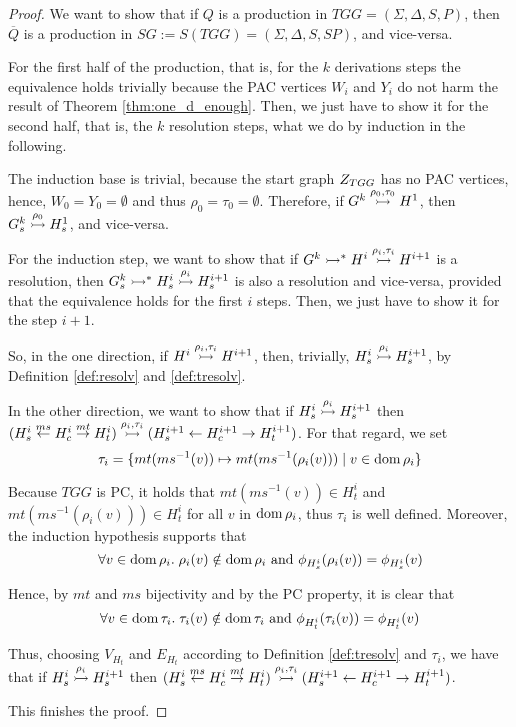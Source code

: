 \begin{proof}
	We want to show that if $Q$ is a production in $TGG = (\Sigma, \Delta, S, P)$, then $\overline{Q}$ is a production in $SG := S(TGG) = (\Sigma, \Delta, S, SP)$, and vice-versa.
	
	For the first half of the production, that is, for the $k$ derivations steps the equivalence holds trivially because the PAC vertices $W_i$ and $Y_i$ do not harm the result of Theorem \ref{thm:one_d_enough}. Then, we just have to show it for the second half, that is, the $k$ resolution steps, what we do by induction in the following.
	
	The induction base is trivial, because the start graph $Z_{TGG}$ has no PAC vertices, hence, $W_0 = Y_0 = \emptyset$ and thus $\rho_0 = \tau_0 = \emptyset$. Therefore, if $G^k \overset{\rho_0,\tau_0}{\rightarrowtail} H^1$, then $G^k_s \overset{\rho_0}{\rightarrowtail} H_s^1$, and vice-versa.
	
	For the induction step, we want to show that if $G^k \rightarrowtail^*_{} H^i \overset{\rho_{i},\tau_{i}}{\rightarrowtail} H^{i+1}$ is a resolution, then $G^k_s \rightarrowtail^*_{} H^i_s \overset{\rho_{i}}{\rightarrowtail} H^{i+1}_s$ is also a resolution and vice-versa, provided that the equivalence holds for the first $i$ steps. Then, we just have to show it for the step $i+1$.
	
	So, in the one direction, if $H^i \overset{\rho_{i},\tau_{i}}{\rightarrowtail} H^{i+1}$, then, trivially, $H^i_s \overset{\rho_{i}}{\rightarrowtail} H^{i+1}_s$, by Definition \ref{def:resolv} and \ref{def:tresolv}.
	
	In the other direction, we want to show that if $H^i_s \overset{\rho_{i}}{\rightarrowtail} H^{i+1}_s$ then $(H^i_s \overset{ms}{\leftarrow} H^i_c \overset{mt}{\rightarrow} H^i_t) \overset{\rho_i,\tau_i}{\rightarrowtail} (H^{i+1}_s \overset{}{\leftarrow} H^{i+1}_c \overset{}{\rightarrow} H^{i+1}_t)$. For that regard, we set 
	\begin{equation*}
		\tau_i = \{mt(ms^{-1}(v)) \mapsto mt(ms^{-1}(\rho_i(v))) \; | \; v \in \operatorname{dom} \rho_i \}
	\end{equation*}
	
	Because $TGG$ is PC, it holds that $mt(ms^{-1}(v)) \in H^i_t$ and $mt(ms^{-1}(\rho_i(v))) \in H^i_t$ for all $v$ in $\operatorname{dom} \rho_i$, thus $\tau_i$ is well defined. Moreover, the induction hypothesis supports that
	\begin{equation*}
		\forall v \in \operatorname{dom} \rho_i . \; \rho_i(v) \notin \operatorname{dom} \rho_i \text{ and } \phi_{H^i_s}(\rho_i(v)) = \phi_{H^i_s}(v)
	\end{equation*}
	
	Hence, by $mt$ and $ms$ bijectivity and by the PC property, it is clear that
	\begin{equation*}
		\forall v \in \operatorname{dom} \tau_i . \; \tau_i(v) \notin \operatorname{dom} \tau_i \text{ and } \phi_{H^i_t}(\tau_i(v)) = \phi_{H^i_t}(v)
	\end{equation*}
	
	Thus, choosing $V_{H_t}$ and $E_{H_t}$ according to Definition \ref{def:tresolv} and $\tau_i$, we have that if $H^i_s \overset{\rho_{i}}{\rightarrowtail} H^{i+1}_s$ then $(H^i_s \overset{ms}{\leftarrow} H^i_c \overset{mt}{\rightarrow} H^i_t) \overset{\rho_i,\tau_i}{\rightarrowtail} (H^{i+1}_s \overset{}{\leftarrow} H^{i+1}_c \overset{}{\rightarrow} H^{i+1}_t)$.
	
	This finishes the proof.
\end{proof}

